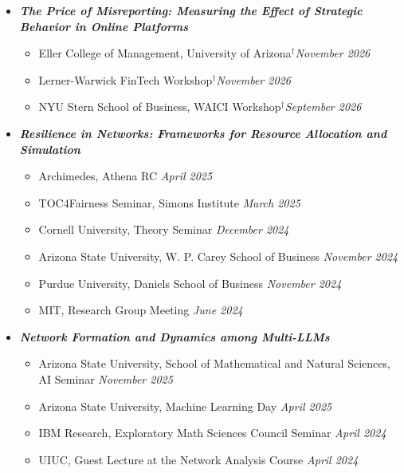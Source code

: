 \documentclass[margin]{res}
\newcommand{\scheduled}[0]{\ensuremath {^\dagger}}
\newcommand{\bemph}[1]{\textbf{\emph{#1}}}
\begin{document}
\begin{resume}
\begin{itemize}[nosep]
	\item \bemph{The Price of Misreporting: Measuring the Effect of Strategic Behavior in Online Platforms}
	\begin{itemize}[nosep]
		\item Eller College of Management, University of Arizona\scheduled \hfill \emph{November 2026}
		\item Lerner-Warwick FinTech Workshop\scheduled \hfill \emph{November 2026}
		\item NYU Stern School of Business, WAICI Workshop\scheduled \hfill \emph{September 2026}
		 
	\end{itemize}
	\item \bemph{Resilience in Networks: Frameworks for Resource Allocation and Simulation}
	\begin{itemize}[nosep]
		\item Archimedes, Athena RC \hfill \emph{April 2025}
		\item TOC4Fairness Seminar, Simons Institute \hfill \emph{March 2025}
		\item Cornell University, Theory Seminar \hfill \emph{December 2024}
		\item Arizona State University, W. P. Carey School of Business \hfill \emph{November 2024}
		\item Purdue University, Daniels School of Business \hfill \emph{November 2024}
		\item MIT, Research Group Meeting \hfill \emph{June 2024}
	\end{itemize}

	\item \bemph{Network Formation and Dynamics among Multi-LLMs}
	\begin{itemize}[nosep]
		\item Arizona State University, School of Mathematical and Natural Sciences, AI Seminar \hfill \emph{November 2025}
		\item Arizona State University, Machine Learning Day \hfill \emph{April 2025}
		\item IBM Research, Exploratory Math Sciences Council Seminar  \hfill \emph{April 2024} 
		\item UIUC, Guest Lecture at the Network Analysis Course \hfill \emph{April 2024}
	\end{itemize}
	

\end{itemize}
\end{resume}
\end{document}
